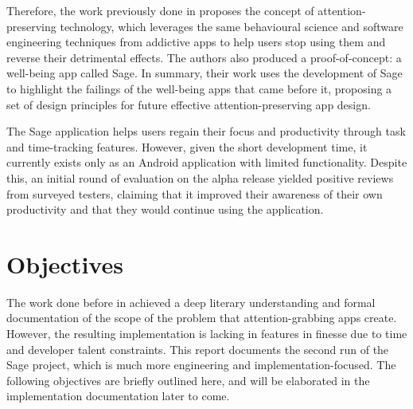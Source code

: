 Therefore, the work previously done in \cite{sagePaper2020} proposes the concept of attention-preserving technology, which leverages the same behavioural science and software engineering techniques from addictive apps to help users stop using them and reverse their detrimental effects. The authors also produced a proof-of-concept: a well-being app called Sage. In summary, their work uses the development of Sage to highlight the failings of the well-being apps that came before it, proposing a set of design principles for future effective attention-preserving app design.

The Sage application helps users regain their focus and productivity through task and time-tracking features. However, given the short development time, it currently exists only as an Android application with limited functionality. Despite this, an initial round of evaluation on the alpha release yielded positive reviews from surveyed testers, claiming that it improved their awareness of their own productivity and that they would continue using the application.

\section{Objectives}
The work done before in \cite{sagePaper2020} achieved a deep literary understanding and formal documentation of the scope of the problem that attention-grabbing apps create. However, the resulting implementation is lacking in features in finesse due to time and developer talent constraints. This report documents the second run of the Sage project, which is much more engineering and implementation-focused. The following objectives are briefly outlined here, and will be elaborated in the implementation documentation later to come.

